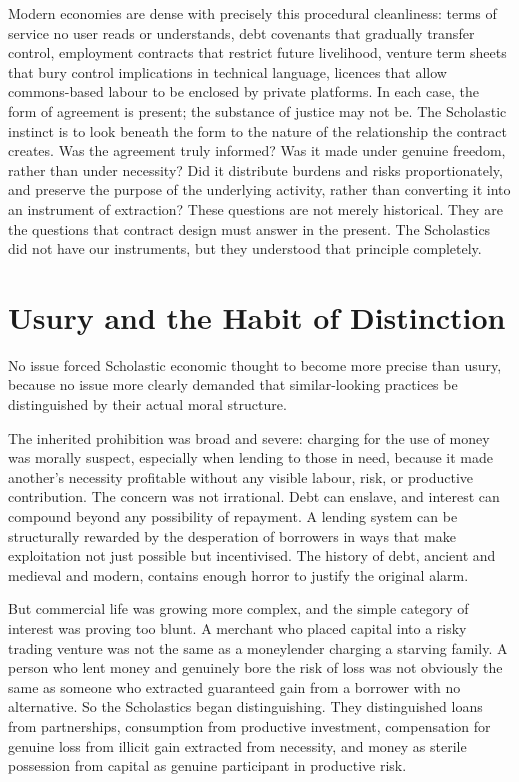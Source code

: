 \documentclass[11pt,a4paper,oneside]{book}
\begin{document}
Modern economies are dense with precisely this procedural cleanliness: terms of service no user reads or understands, debt covenants that gradually transfer control, employment contracts that restrict future livelihood, venture term sheets that bury control implications in technical language, licences that allow commons-based labour to be enclosed by private platforms. In each case, the form of agreement is present; the substance of justice may not be. The Scholastic instinct is to look beneath the form to the nature of the relationship the contract creates. Was the agreement truly informed? Was it made under genuine freedom, rather than under necessity? Did it distribute burdens and risks proportionately, and preserve the purpose of the underlying activity, rather than converting it into an instrument of extraction? These questions are not merely historical. They are the questions that contract design must answer in the present. The Scholastics did not have our instruments, but they understood that principle completely.

\section*{Usury and the Habit of Distinction}

No issue forced Scholastic economic thought to become more precise than usury, because no issue more clearly demanded that similar-looking practices be distinguished by their actual moral structure.

The inherited prohibition was broad and severe: charging for the use of money was morally suspect, especially when lending to those in need, because it made another's necessity profitable without any visible labour, risk, or productive contribution. The concern was not irrational. Debt can enslave, and interest can compound beyond any possibility of repayment. A lending system can be structurally rewarded by the desperation of borrowers in ways that make exploitation not just possible but incentivised. The history of debt, ancient and medieval and modern, contains enough horror to justify the original alarm.

But commercial life was growing more complex, and the simple category of interest was proving too blunt. A merchant who placed capital into a risky trading venture was not the same as a moneylender charging a starving family. A person who lent money and genuinely bore the risk of loss was not obviously the same as someone who extracted guaranteed gain from a borrower with no alternative. So the Scholastics began distinguishing. They distinguished loans from partnerships, consumption from productive investment, compensation for genuine loss from illicit gain extracted from necessity, and money as sterile possession from capital as genuine participant in productive risk.
\end{document}
